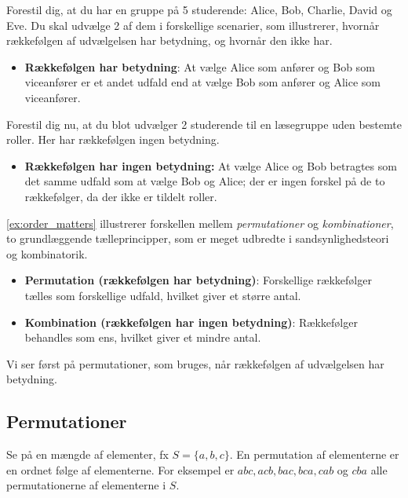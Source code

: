 \begin{example}
    Forestil dig, at du har en gruppe på 5 studerende: Alice, Bob, Charlie, David og Eve. Du skal udvælge 2 af dem i forskellige scenarier, som illustrerer, hvornår rækkefølgen af udvælgelsen har betydning, og hvornår den ikke har.
    \begin{itemize}
        \item \textbf{Rækkefølgen har betydning}: At vælge Alice som anfører og Bob som viceanfører er et andet udfald end at vælge Bob som anfører og Alice som viceanfører.
        \end{itemize}
    Forestil dig nu, at du blot udvælger 2 studerende til en læsegruppe uden bestemte roller. Her har rækkefølgen ingen betydning.
    \begin{itemize}
        \item \textbf{Rækkefølgen har ingen betydning:}  At vælge Alice og Bob betragtes som det samme udfald som at vælge Bob og Alice; der er ingen forskel på de to rækkefølger, da der ikke er tildelt roller.
    \end{itemize}
    \label{ex:order_matters}
\end{example}

\autoref{ex:order_matters} illustrerer forskellen mellem \textit{permutationer} og \textit{kombinationer}, to grundlæggende tælleprincipper, som er meget udbredte i sandsynlighedsteori og kombinatorik.

\begin{definition}
    \begin{itemize}
        \item \textbf{Permutation (rækkefølgen har betydning)}: Forskellige rækkefølger tælles som forskellige udfald, hvilket giver et større antal.
        \item \textbf{Kombination (rækkefølgen har ingen betydning)}: Rækkefølger behandles som ens, hvilket giver et mindre antal.
    \end{itemize}
\end{definition}

Vi ser først på permutationer, som bruges, når rækkefølgen af udvælgelsen har betydning.

\subsection*{Permutationer}

Se på en mængde af elementer, fx $S=\{a, b, c\}$. En permutation af elementerne er en ordnet følge af elementerne. For eksempel er $a b c, a c b, b a c, b c a, c a b$ og $c b a$ alle permutationerne af elementerne i $S$.

